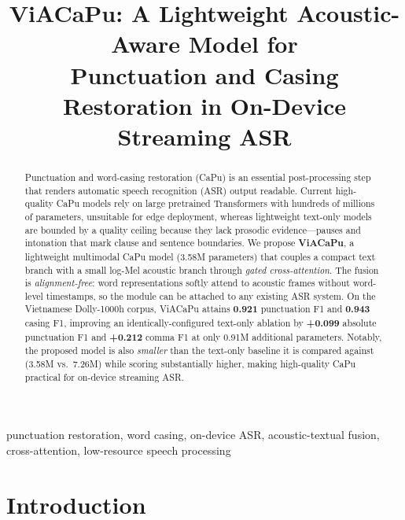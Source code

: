 \documentclass[conference]{IEEEtran}
\begin{document}
\title{ViACaPu: A Lightweight Acoustic-Aware Model for\\
Punctuation and Casing Restoration in On-Device Streaming ASR}

\author{
}

\maketitle

\begin{abstract}
Punctuation and word-casing restoration (CaPu) is an essential post-processing
step that renders automatic speech recognition (ASR) output readable. Current
high-quality CaPu models rely on large pretrained Transformers with hundreds of
millions of parameters, unsuitable for edge deployment, whereas lightweight
text-only models are bounded by a quality ceiling because they lack prosodic
evidence---pauses and intonation that mark clause and sentence boundaries. We
propose \textbf{ViACaPu}, a lightweight multimodal CaPu model (3.58M parameters)
that couples a compact text branch with a small log-Mel acoustic branch through
\emph{gated cross-attention}. The fusion is \emph{alignment-free}: word
representations softly attend to acoustic frames without word-level timestamps, so
the module can be attached to any existing ASR system. On the Vietnamese
Dolly-1000h corpus, ViACaPu attains \textbf{0.921} punctuation F1 and
\textbf{0.943} casing F1, improving an identically-configured text-only ablation by
\textbf{+0.099} absolute punctuation F1 and \textbf{+0.212} comma F1 at only 0.91M
additional parameters. Notably, the proposed model is also \emph{smaller} than the
text-only baseline it is compared against (3.58M vs.\ 7.26M) while scoring
substantially higher, making high-quality CaPu practical for on-device streaming
ASR.
\end{abstract}

\begin{IEEEkeywords}
punctuation restoration, word casing, on-device ASR, acoustic-textual fusion,
cross-attention, low-resource speech processing
\end{IEEEkeywords}

\section{Introduction}
\end{document}
